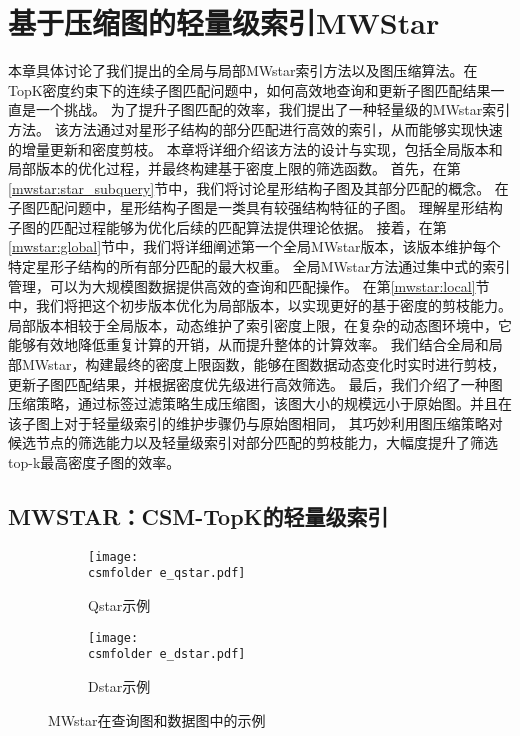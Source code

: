 \chapter{基于压缩图的轻量级索引MWStar}
\label{ch4}
本章具体讨论了我们提出的全局与局部MWstar索引方法以及图压缩算法。在TopK密度约束下的连续子图匹配问题中，如何高效地查询和更新子图匹配结果一直是一个挑战。
为了提升子图匹配的效率，我们提出了一种轻量级的MWstar索引方法。
该方法通过对星形子结构的部分匹配进行高效的索引，从而能够实现快速的增量更新和密度剪枝。
本章将详细介绍该方法的设计与实现，包括全局版本和局部版本的优化过程，并最终构建基于密度上限的筛选函数。
首先，在第\ref{mwstar:star_subquery}节中，我们将讨论星形结构子图及其部分匹配的概念。
在子图匹配问题中，星形结构子图是一类具有较强结构特征的子图。
理解星形结构子图的匹配过程能够为优化后续的匹配算法提供理论依据。
接着，在第\ref{mwstar:global}节中，我们将详细阐述第一个全局MWstar版本，该版本维护每个特定星形子结构的所有部分匹配的最大权重。
全局MWstar方法通过集中式的索引管理，可以为大规模图数据提供高效的查询和匹配操作。
在第\ref{mwstar:local}节中，我们将把这个初步版本优化为局部版本，以实现更好的基于密度的剪枝能力。
局部版本相较于全局版本，动态维护了索引密度上限，在复杂的动态图环境中，它能够有效地降低重复计算的开销，从而提升整体的计算效率。
我们结合全局和局部MWstar，构建最终的密度上限函数，能够在图数据动态变化时实时进行剪枝，更新子图匹配结果，并根据密度优先级进行高效筛选。
最后，我们介绍了一种图压缩策略，通过标签过滤策略生成压缩图，该图大小的规模远小于原始图。并且在该子图上对于轻量级索引的维护步骤仍与原始图相同，
其巧妙利用图压缩策略对候选节点的筛选能力以及轻量级索引对部分匹配的剪枝能力，大幅度提升了筛选top-k最高密度子图的效率。

\section{MWSTAR：CSM-TopK的轻量级索引}

\begin{figure}[h!]
\def\wscorevone{0.45}
\centering
\begin{subfigure}[t]{0.465\linewidth}
\centering
\resizebox{\linewidth}{!}
{
\texttt{[image: \\csmfolder e\_qstar.pdf]}
}
\caption{Qstar示例}
\label{fig:qstar}
\end{subfigure}
\begin{subfigure}[t]{0.515\linewidth}
\centering
\resizebox{\linewidth}{!}
{
\texttt{[image: \\csmfolder e\_dstar.pdf]}
}
\caption{Dstar示例}
\label{fig:dstar}
\end{subfigure}
\caption{MWstar在查询图和数据图中的示例}
\label{fig:exp:mwstar}
\end{figure}

